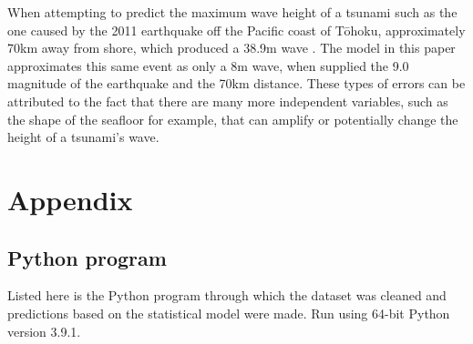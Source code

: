 \documentclass[11pt,letterpaper]{article}
\begin{document}
When attempting to predict the maximum wave height of a tsunami such as the one
caused by the 2011 earthquake off the Pacific coast of Tōhoku, approximately 70km
away from shore, which produced a 38.9m wave \cite{yomiuri_2011}. The model in this
paper approximates this same event as only a 8m wave, when supplied the 9.0 magnitude
of the earthquake and the 70km distance. These types of errors can be attributed to the
fact that there are many more independent variables, such as the shape of the seafloor for
example, that can amplify or potentially change the height of a tsunami's wave.

\printbibliography[heading=bibintoc, title=Works Cited]

\appendix
\section{Appendix}
\label{app}
\subsection{Python program}
\label{app:scripts}

Listed here is the Python program through which the dataset was cleaned and
predictions based on the statistical model were made. Run using 64-bit Python
version 3.9.1.


\end{document}
